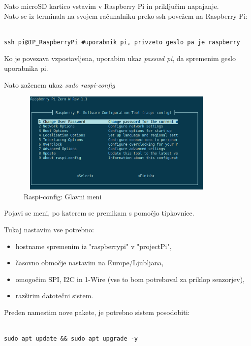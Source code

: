 \documentclass[11pt]{article}
\begin{document}
Nato microSD kartico vstavim v Raspberry Pi in priključim napajanje.
\\

Nato se iz terminala na svojem računalniku preko \gls{ssh} povežem na Raspberry Pi:

\begin{verbatim}

ssh pi@IP_RaspberryPi #uporabnik pi, privzeto geslo pa je raspberry
\end{verbatim}

Ko je povezava vzpostavljena, uporabim ukaz \textit{passwd pi}, da spremenim geslo uporabnika pi.

Nato zaženem ukaz \textit{sudo raspi-config}
\begin{figure}[h]
\centering
\includegraphics[width=10cm, height=5cm]{images/raspi-config.png}
\caption{Raspi-config: Glavni meni}
\end{figure}

Pojavi se meni, po katerem se premikam s pomočjo tipkovnice.

Tukaj nastavim vse potrebno:
\begin{itemize}
    \item hostname spremenim iz "raspberrypi" v "projectPi",
    \item časovno območje nastavim na Europe/Ljubljana,
    \item omogočim SPI, I2C in 1-Wire (vse to bom potreboval za priklop senzorjev),
    \item razširim datotečni sistem.
\end{itemize}

Preden namestim nove pakete, je potrebno sistem posodobiti:

\begin{verbatim}

sudo apt update && sudo apt upgrade -y
\end{verbatim}
\end{document}
